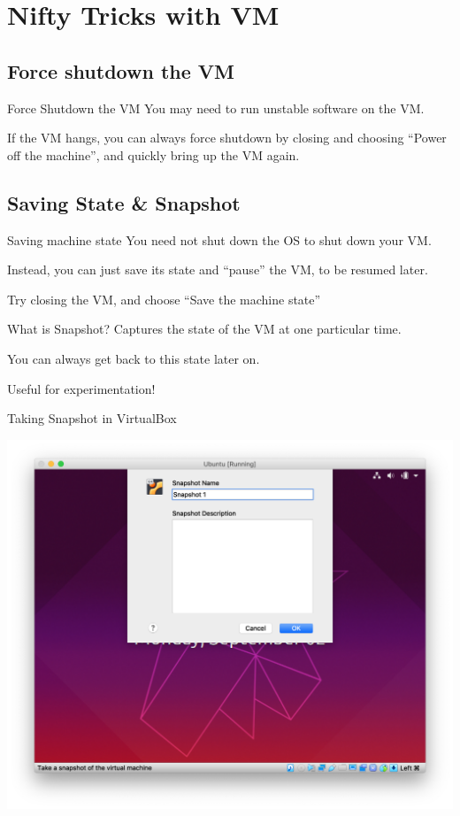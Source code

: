 \documentclass[12pt]{beamer}
\begin{document}
\section{Nifty Tricks with VM}
\subsection{Force shutdown the VM}
\begin{frame}{Force Shutdown the VM}
  You may need to run unstable software on the VM.

  If the VM hangs, you can always force shutdown by closing and choosing ``Power off the machine'', and quickly bring up the VM again.
\end{frame}

\subsection{Saving State \& Snapshot}
\begin{frame}{Saving machine state}
  You need not shut down the OS to shut down your VM.

  Instead, you can just save its state and ``pause'' the VM, to be resumed later.

  Try closing the VM, and choose ``Save the machine state''
\end{frame}

\begin{frame}{What is Snapshot?}
  Captures the state of the VM at one particular time.

  You can always get back to this state later on.

  Useful for experimentation!
\end{frame}

\begin{frame}{Taking Snapshot in VirtualBox}
  \begin{center}
    \includegraphics[width=0.7\linewidth]{snapshot}
  \end{center}
\end{frame}
\end{document}
